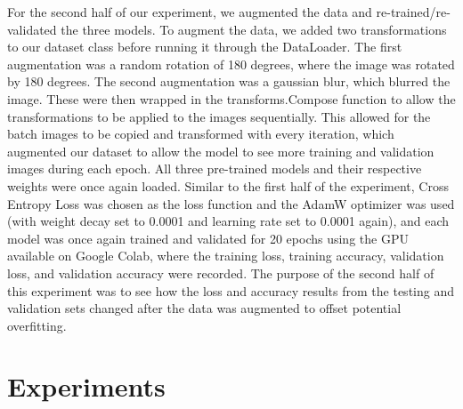 \documentclass{article}
\begin{document}
For the second half of our experiment, we augmented the data and re-trained/re-validated the three models. To augment the data, we added two transformations to our dataset class before running it through the DataLoader. The first augmentation was a random rotation of 180 degrees, where the image was rotated by 180 degrees. The second augmentation was a gaussian blur, which blurred the image. These were then wrapped in the transforms.Compose function to allow the transformations to be applied to the images sequentially. This allowed for the batch images to be copied and transformed with every iteration, which augmented our dataset to allow the model to see more training and validation images during each epoch. All three pre-trained models and their respective weights were once again loaded. Similar to the first half of the experiment, Cross Entropy Loss was chosen as the loss function and the AdamW optimizer was used (with weight decay set to 0.0001 and learning rate set to 0.0001 again), and each model was once again trained and validated for 20 epochs using the GPU available on Google Colab, where the training loss, training accuracy, validation loss, and validation accuracy were recorded. The purpose of the second half of this experiment was to see how the loss and accuracy results from the testing and validation sets changed after the data was augmented to offset potential overfitting.

\section{Experiments}
\end{document}
